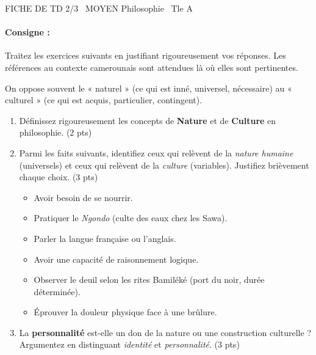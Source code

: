 \documentclass[11pt]{article}
\begin{document}
\begin{tcolorbox}[enhanced,colback=popink,colframe=popink,arc=10pt,boxrule=0pt,left=12pt,right=12pt,top=9pt,bottom=9pt]
{\color{white}\popxbold\small FICHE DE TD 2/3 \textbullet\ MOYEN \hfill Philosophie \textbullet\ Tle A\par}
\end{tcolorbox}
\vspace{4pt}
\paragraph{Consigne :} Traitez les exercices suivants en justifiant rigoureusement vos réponses. Les références au contexte camerounais sont attendues là où elles sont pertinentes.

\begin{exercice}
On oppose souvent le « naturel » (ce qui est inné, universel, nécessaire) au « culturel » (ce qui est acquis, particulier, contingent).
\begin{enumerate}
    \item Définissez rigoureusement les concepts de \textbf{Nature} et de \textbf{Culture} en philosophie. (2 pts)
    \item Parmi les faits suivants, identifiez ceux qui relèvent de la \textit{nature humaine} (universels) et ceux qui relèvent de la \textit{culture} (variables). Justifiez brièvement chaque choix. (3 pts)
    \begin{itemize}
        \item Avoir besoin de se nourrir.
        \item Pratiquer le \textit{Ngondo} (culte des eaux chez les Sawa).
        \item Parler la langue française ou l'anglais.
        \item Avoir une capacité de raisonnement logique.
        \item Observer le deuil selon les rites Bamiléké (port du noir, durée déterminée).
        \item Éprouver la douleur physique face à une brûlure.
    \end{itemize}
    \item La \textbf{personnalité} est-elle un don de la nature ou une construction culturelle ? Argumentez en distinguant \textit{identité} et \textit{personnalité}. (3 pts)
\end{enumerate}
\end{exercice}
\end{document}
